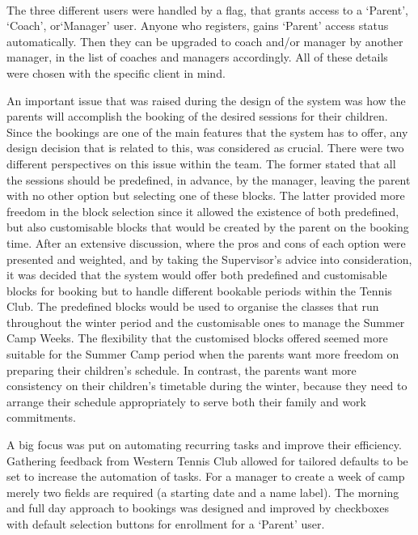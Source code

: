 \documentclass{l3proj}
\begin{document}
\\
\par
The three different users were handled by a flag, that grants access to a `Parent', `Coach', or`Manager' user. Anyone who registers, gains `Parent' access status automatically. Then they can be upgraded to coach and/or manager by another manager, in the list of coaches and managers accordingly. All of these details were chosen with the specific client in mind.\\
\par An important issue that was raised during the design of the system was how the parents will accomplish the booking of the desired sessions for their children. Since the bookings are one of the main features that the system has to offer, any design decision that is related to this, was considered as crucial. There were two different perspectives on this issue within the team. The former stated that all the sessions should be predefined, in advance, by the manager, leaving the parent with no other option but selecting one of these blocks. The latter provided more freedom in the block selection since it allowed the existence of both predefined, but also customisable blocks that would be created by the parent on the booking time. After an extensive discussion, where the pros and cons of each option were presented and weighted, and by taking the  Supervisor's advice into consideration, it was decided that the system would offer both predefined and customisable blocks for booking but to handle different bookable periods within the Tennis Club. The predefined blocks would be used to organise the classes that run throughout the winter period and the customisable ones to manage the Summer Camp Weeks. The flexibility that the customised blocks offered seemed more suitable for the Summer Camp period when the parents want more freedom on preparing their children's schedule. In contrast, the parents want more consistency on their children's timetable during the winter, because they need to arrange their schedule appropriately to serve both their family and work commitments.\\
\par A big focus was put on automating recurring tasks and improve their efficiency. Gathering feedback from Western Tennis Club allowed for tailored defaults to be set to increase the automation of tasks. For a manager to create a week of camp merely two fields are required (a starting date and a name label). The morning and full day approach to bookings was designed and improved by checkboxes with default selection buttons for enrollment for a `Parent' user.\\
\end{document}
